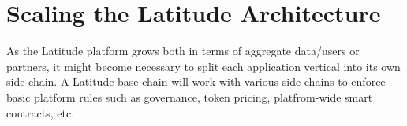 \newpage
\section{Scaling the Latitude Architecture}
\label{app:latchain}

As the Latitude platform grows both in terms of aggregate data/users or partners, it might become necessary to split
each application vertical into its own side-chain. A Latitude base-chain will work with various side-chains to enforce
basic platform rules such as governance, token pricing, platfrom-wide smart contracts, etc.  
